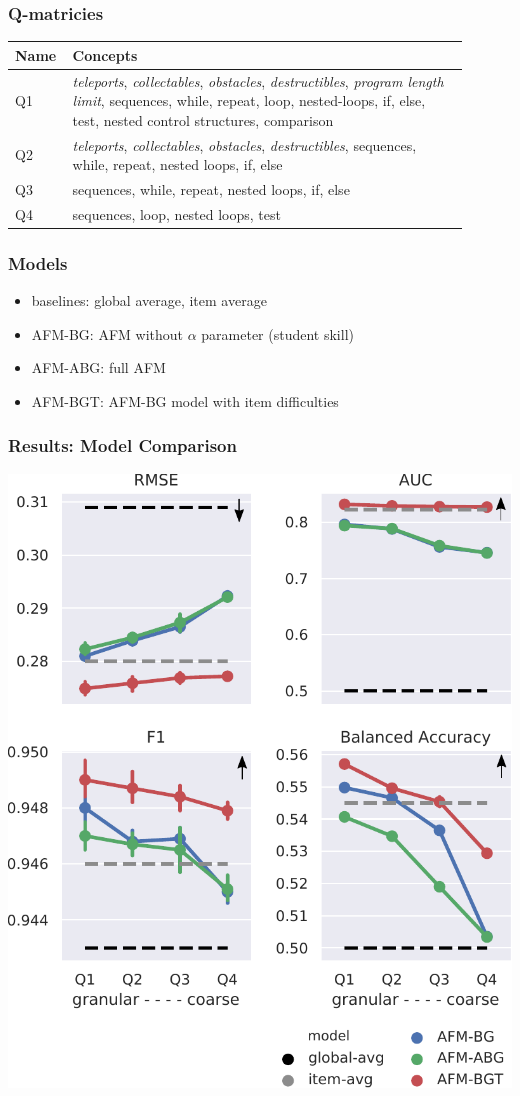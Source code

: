 \documentclass[bigger]{beamer}
\begin{document}
\begin{frame}
  \frametitle{Q-matricies}

  \begin{center}
  \begin{tabular}{p{0.08\linewidth}p{0.82\linewidth}}
    \toprule
    Name & Concepts\\
    \midrule
    Q1 & \emph{teleports}, \emph{collectables}, \emph{obstacles},
    \emph{destructibles}, \emph{program length limit}, sequences, while,
    repeat, loop, nested-loops, if, else, test, nested control structures,
    comparison\\
    Q2 & \emph{teleports}, \emph{collectables}, \emph{obstacles},
    \emph{destructibles}, sequences, while, repeat, nested loops, if, else\\
    Q3 & sequences, while, repeat, nested loops, if, else\\
    Q4 & sequences, loop, nested loops, test\\
    \bottomrule
  \end{tabular}    
  \end{center}
\end{frame}

\begin{frame}
  \frametitle{Models}

  \begin{itemize}
  \item baselines: global average, item average
  \item AFM-BG: AFM without $\alpha$ parameter (student skill)
  \item AFM-ABG: full AFM 
  \item AFM-BGT: AFM-BG model with item difficulties
  \end{itemize}
\end{frame}

\begin{frame}
  \frametitle{Results: Model Comparison}

  \begin{center}
    \includegraphics[width=.5\linewidth]{programming-metrics}
  \end{center}
\end{frame}
\end{document}
